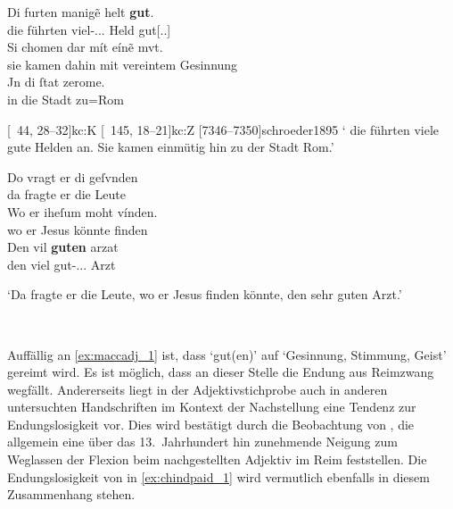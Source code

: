 \begin{exe}
\ex \label{ex:maccadj}
	\begin{xlist}
	\ex \label{ex:maccadj_1}
		\gll Di furten manigẽ helt \textbf{gut}. \\
			die führten viel-\Acc.\Sg.\MascM.\St{} Held gut[\Acc.\Sg.\MascM] \\
	\sn \gll Si chomen dar mít eínẽ mvt. \\
			sie kamen dahin mit vereintem Gesinnung \\
	\sn \gll Jn di ſtat zerome. \\
			in die Stadt zu=Rom \\
		\begin{taggedline}{\parencites%
			[\pno~55\vb, 20--24]{kc:M}[vgl.]%
			[\pno~31\vb, 27--31]{kc:A1}
			[\pno~43\vb,15--19]{kc:H}
			[\pno~38\va, 18--21]{kc:C1}
			[\pno~44\rb, 28--32]{kc:K}
			[\pno~145\ra, 18--21]{kc:Z}
			[7346--7350]{schroeder1895}
		}
		\trans `\textelp{} die führten viele gute Helden an. Sie kamen einmütig 	hin zu der Stadt Rom.'
		\end{taggedline}

	\ex \label{ex:maccadj_2}
		\gll Do vragt er di geſvnden \\
			da fragte er die Leute \\
	\sn \gll Wo er iheſum moht vínden. \\
			wo er Jesus könnte finden \\
	\sn \gll Den vil \textbf{guten} arzat \\
			den viel gut-\Acc.\Sg.\MascM.\Wk{} Arzt \\
		\begin{taggedline}{\parencites%
			[\pno~6\rb, 31]{kc:M}[vgl.]%
			[\pno~3\vb, 26--28]{kc:A1}
			[\pno~4\rb, 28--30]{kc:H}
			[\pno~4\rb, 35--36]{kc:B1}
			[\pno~7\ra, 9--10]{kc:P}
			[\pno~4\ra, 24--27]{kc:C1}
			[\pno~12\va, 12--15]{kc:Z}
			[723--725]{schroeder1895}
		}
		\trans `Da fragte er die Leute, wo er Jesus finden
			könnte, den sehr guten Arzt.'%
		\end{taggedline}
		\\
	\end{xlist}
\end{exe}

Auffällig an \cref{ex:maccadj_1} ist, dass  `gut(en)' auf
 `Gesinnung, Stimmung, Geist' gereimt wird. Es ist möglich,
dass an dieser Stelle die Endung aus Reimzwang wegfällt. Andererseits liegt in
der Adjektivstichprobe auch in anderen untersuchten Handschriften im Kontext
der Nachstellung eine Tendenz zur Endungslosigkeit vor. Dies wird bestätigt
durch die Beobachtung von \citet[241]{ksw2}, die allgemein eine über das
13.~Jahrhundert hin zunehmende Neigung zum Weglassen der Flexion beim
nachgestellten Adjektiv im Reim feststellen. Die Endungslosigkeit von
 in \cref{ex:chindpaid_1} wird vermutlich ebenfalls in diesem
Zusammenhang stehen.

